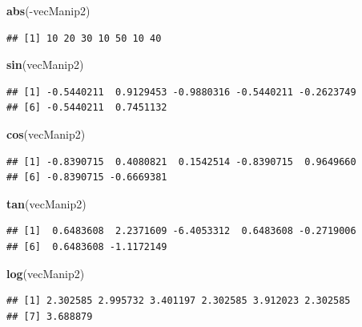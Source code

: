 \documentclass[twoside,symmetric]{book}
\newenvironment{Shaded}{}{}
\newcommand{\KeywordTok}[1]{\textbf{#1}}
\newcommand{\NormalTok}[1]{#1}
\newcommand{\OperatorTok}[1]{#1}
\begin{document}
\begin{Shaded}
\begin{Highlighting}[]
\KeywordTok{abs}\NormalTok{(}\OperatorTok{-}\NormalTok{vecManip2)}
\end{Highlighting}
\end{Shaded}

\begin{verbatim}
## [1] 10 20 30 10 50 10 40
\end{verbatim}

\begin{Shaded}
\begin{Highlighting}[]
\KeywordTok{sin}\NormalTok{(vecManip2)}
\end{Highlighting}
\end{Shaded}

\begin{verbatim}
## [1] -0.5440211  0.9129453 -0.9880316 -0.5440211 -0.2623749
## [6] -0.5440211  0.7451132
\end{verbatim}

\begin{Shaded}
\begin{Highlighting}[]
\KeywordTok{cos}\NormalTok{(vecManip2)}
\end{Highlighting}
\end{Shaded}

\begin{verbatim}
## [1] -0.8390715  0.4080821  0.1542514 -0.8390715  0.9649660
## [6] -0.8390715 -0.6669381
\end{verbatim}

\begin{Shaded}
\begin{Highlighting}[]
\KeywordTok{tan}\NormalTok{(vecManip2)}
\end{Highlighting}
\end{Shaded}

\begin{verbatim}
## [1]  0.6483608  2.2371609 -6.4053312  0.6483608 -0.2719006
## [6]  0.6483608 -1.1172149
\end{verbatim}

\begin{Shaded}
\begin{Highlighting}[]
\KeywordTok{log}\NormalTok{(vecManip2)}
\end{Highlighting}
\end{Shaded}

\begin{verbatim}
## [1] 2.302585 2.995732 3.401197 2.302585 3.912023 2.302585
## [7] 3.688879
\end{verbatim}
\end{document}
